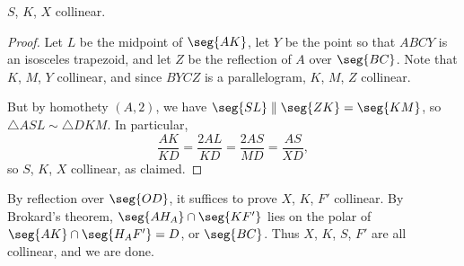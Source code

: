 \begin{claim}
    $S$, $K$, $X$ collinear.
\end{claim}
\begin{proof}
    Let $L$ be the midpoint of $\seg{AK}$, let $Y$ be the point so that $ABCY$ is an isosceles trapezoid, and let $Z$ be the reflection of $A$ over $\seg{BC}$. Note that $K$, $M$, $Y$ collinear, and since $BYCZ$ is a parallelogram, $K$, $M$, $Z$ collinear.

    But by homothety $(A,2)$, we have $\seg{SL}\parallel\seg{ZK}=\seg{KM}$, so $\triangle ASL\sim\triangle DKM$. In particular, \[\frac{AK}{KD}=\frac{2AL}{KD}=\frac{2AS}{MD}=\frac{AS}{XD},\]
    so $S$, $K$, $X$ collinear, as claimed.
\end{proof}

By reflection over $\seg{OD}$, it suffices to prove $X$, $K$, $F'$ collinear. By Brokard's theorem, $\seg{AH_A}\cap\seg{KF'}$ lies on the polar of $\seg{AK}\cap\seg{H_AF'}=D$, or $\seg{BC}$. Thus $X$, $K$, $S$, $F'$ are all collinear, and we are done.
